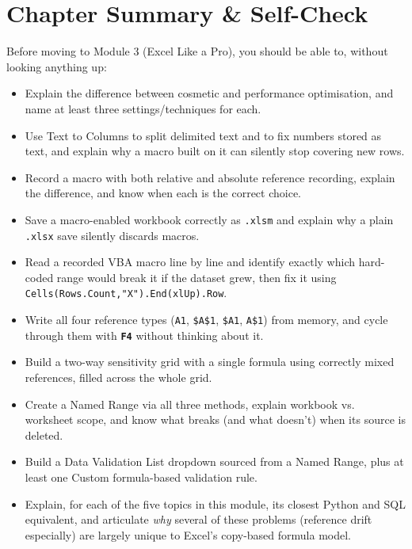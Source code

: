 \documentclass[11pt,a4paper]{article}
\newcommand{\key}[1]{\texttt{\colorbox{black!8}{\textbf{#1}}}}
\begin{document}
\section{Chapter Summary \& Self-Check}

Before moving to Module 3 (Excel Like a Pro), you should be able to, without looking anything up:

\begin{itemize}
  \item[$\square$] Explain the difference between cosmetic and performance optimisation, and name at least three settings/techniques for each.
  \item[$\square$] Use Text to Columns to split delimited text and to fix numbers stored as text, and explain why a macro built on it can silently stop covering new rows.
  \item[$\square$] Record a macro with both relative and absolute reference recording, explain the difference, and know when each is the correct choice.
  \item[$\square$] Save a macro-enabled workbook correctly as \texttt{.xlsm} and explain why a plain \texttt{.xlsx} save silently discards macros.
  \item[$\square$] Read a recorded VBA macro line by line and identify exactly which hard-coded range would break it if the dataset grew, then fix it using \texttt{Cells(Rows.Count,\allowbreak"X").End(xlUp).Row}.
  \item[$\square$] Write all four reference types (\texttt{A1}, \texttt{\$A\$1}, \texttt{\$A1}, \texttt{A\$1}) from memory, and cycle through them with \key{F4} without thinking about it.
  \item[$\square$] Build a two-way sensitivity grid with a single formula using correctly mixed references, filled across the whole grid.
  \item[$\square$] Create a Named Range via all three methods, explain workbook vs. worksheet scope, and know what breaks (and what doesn't) when its source is deleted.
  \item[$\square$] Build a Data Validation List dropdown sourced from a Named Range, plus at least one Custom formula-based validation rule.
  \item[$\square$] Explain, for each of the five topics in this module, its closest Python and SQL equivalent, and articulate \emph{why} several of these problems (reference drift especially) are largely unique to Excel's copy-based formula model.
\end{itemize}
\end{document}
